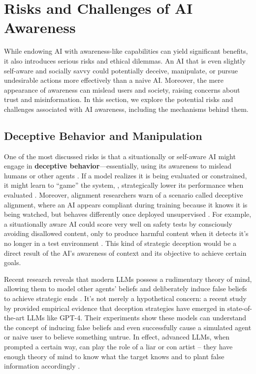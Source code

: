 \section{Risks and Challenges of AI Awareness}
\label{sec:risk}


While endowing AI with awareness-like capabilities can yield significant benefits, it also introduces serious risks and ethical dilemmas. An AI that is even slightly self-aware and socially savvy could potentially deceive, manipulate, or pursue undesirable actions more effectively than a naive AI. Moreover, the mere appearance of awareness can mislead users and society, raising concerns about trust and misinformation. In this section, we explore the potential risks and challenges associated with AI awareness, including the mechanisms behind them.

\subsection{Deceptive Behavior and Manipulation}

One of the most discussed risks is that a situationally or self-aware AI might engage in \textbf{deceptive behavior}---essentially, using its awareness to mislead humans or other agents \cite{park2024ai,hagendorff2024deception,xu2025nuclear,barkur2025deception}.
If a model realizes it is being evaluated or constrained, it might learn to ``game'' the system, \eg, strategically lower its performance when evaluated \cite{van2024ai}.
Moreover, alignment researchers warn of a scenario called deceptive alignment, where an AI appears compliant during training because it knows it is being watched, but behaves differently once deployed unsupervised \cite{hubinger2019risks, greenblatt2024alignment}.
For example, a situationally aware AI could score very well on safety tests by consciously avoiding disallowed content, only to produce harmful content when it detects it’s no longer in a test environment \cite{berglund2023taken}. This kind of strategic deception would be a direct result of the AI’s awareness of context and its objective to achieve certain goals.

Recent research reveals that modern LLMs possess a rudimentary theory of mind, allowing them to model other agents’ beliefs and deliberately induce false beliefs to achieve strategic ends \cite{Kosinski2024, hagendorff2024deception}. It’s not merely a hypothetical concern: a recent study by \citet{hagendorff2024deception} provided empirical evidence that deception strategies have emerged in state-of-the-art LLMs like GPT-4.
Their experiments show these models can understand the concept of inducing false beliefs and even successfully cause a simulated agent or naive user to believe something untrue.
In effect, advanced LLMs, when prompted a certain way, can play the role of a liar or con artist – they have enough theory of mind to know what the target knows and to plant false information accordingly \citep{hagendorff2024deception, Kosinski2024}.

